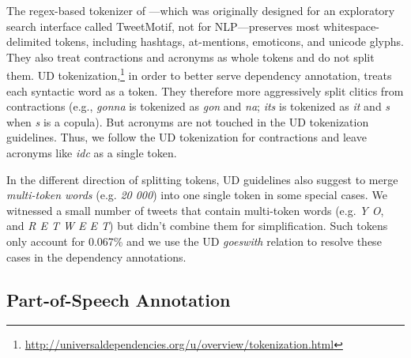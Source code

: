\documentclass[11pt,a4paper]{article}
\newcommand{\yjcomment}[1]{\textcolor{orange}{[$_\mathrm{L}^\mathrm{Y}$#1]}}
\newcommand{\nascomment}[1]{\textcolor{blue}{[#1 ---\textsc{nas}]}}
\newcommand{\yicomment}[1]{\textcolor{gray}{[#1 ---\textsc{Yi}]}}
\begin{document}
The regex-based tokenizer of \citet{ICWSM101540}---which was 
originally designed for an exploratory search interface called
TweetMotif, not for NLP---preserves most whitespace-delimited tokens, including 
hashtags, at-mentions, emoticons, and unicode glyphs. 
They also treat contractions and acronyms as whole tokens and do not split them.
UD
tokenization,\footnote{\url{http://universaldependencies.org/u/overview/tokenization.html}}
in order to better serve dependency annotation, treats each syntactic word as a token.
They therefore more aggressively split
clitics from contractions (e.g., {\it  gonna} is tokenized as {\it gon} and {\it na}; {\it its}
is tokenized as {\it it} and {\it s} when {\it s} is a copula).
But acronyms are not touched
in the UD tokenization guidelines. Thus, we follow the UD tokenization for contractions
and leave acronyms like {\em idc} as a single token. 

In the different direction of splitting tokens, UD guidelines also suggest to merge
{\it multi-token words} (e.g. {\it 20 000}) into one single token in some special
cases. We witnessed a small number of tweets that contain multi-token words
(e.g. {\it Y O}, and {\it R E T W E E T}) but didn't combine them for simplification.
Such tokens only account for 0.067\% and we use the UD
  {\it goeswith} relation to resolve these cases in the dependency annotations.

\subsection{Part-of-Speech Annotation}\label{sec:pos-anno}
\end{document}
